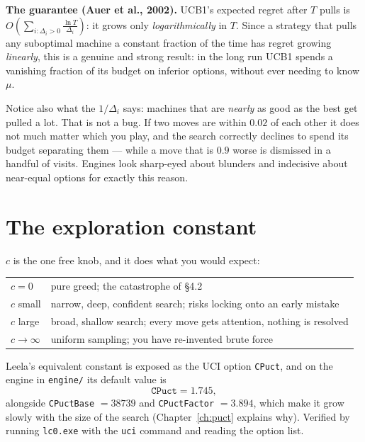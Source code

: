 \begin{established}
\textbf{The guarantee (Auer et al., 2002).} UCB1's expected regret after $T$ pulls is
$O\!\left(\sum_{i:\Delta_i>0} \frac{\ln T}{\Delta_i}\right)$: it grows only
\emph{logarithmically} in $T$. Since a strategy that pulls any suboptimal machine a constant
fraction of the time has regret growing \emph{linearly}, this is a genuine and strong
result: in the long run UCB1 spends a vanishing fraction of its budget on inferior options,
without ever needing to know $\mu$.
\end{established}

Notice also what the $1/\Delta_i$ says: machines that are \emph{nearly} as good as the best
get pulled a lot. That is not a bug. If two moves are within $0.02$ of each other it does
not much matter which you play, and the search correctly declines to spend its budget
separating them --- while a move that is $0.9$ worse is dismissed in a handful of visits.
Engines look sharp-eyed about blunders and indecisive about near-equal options for exactly
this reason.

\section{The exploration constant}

$c$ is the one free knob, and it does what you would expect:

\begin{center}
\begin{tabular}{@{}ll@{}}
\toprule
$c = 0$ & pure greed; the catastrophe of §4.2 \\
$c$ small & narrow, deep, confident search; risks locking onto an early mistake \\
$c$ large & broad, shallow search; every move gets attention, nothing is resolved \\
$c \to \infty$ & uniform sampling; you have re-invented brute force \\
\bottomrule
\end{tabular}
\end{center}

\begin{realdata}[title={Real engine setting}]
Leela's equivalent constant is exposed as the UCI option \texttt{CPuct}, and on the engine in
\texttt{engine/} its default value is
\[
  \texttt{CPuct} = 1.745,
\]
alongside \texttt{CPuctBase} $= 38739$ and \texttt{CPuctFactor} $= 3.894$, which make it grow
slowly with the size of the search (Chapter~\ref{ch:puct} explains why). Verified by running
\texttt{lc0.exe} with the \texttt{uci} command and reading the option list.
\end{realdata}

